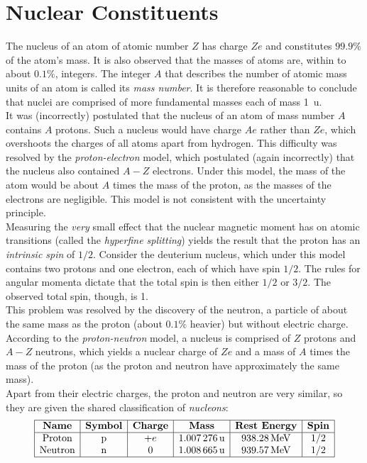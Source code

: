 \documentclass{subfiles}
\begin{document}
	\section{Nuclear Constituents}
		The nucleus of an atom of atomic number \(Z\) has charge \(Ze\) and constitutes \(99.9\%\) of the atom's mass. It is also observed that the masses of atoms are, within to about \(0.1\%\), integers. The integer \(A\) that describes the number of atomic mass units of an atom is called its \textit{mass number}. It is therefore reasonable to conclude that nuclei are comprised of more fundamental masses each of mass \SI{1}{u}. \\
			It was (incorrectly) postulated that the nucleus of an atom of mass number \(A\) contains \(A\) protons. Such a nucleus would have charge \(Ae\) rather than \(Ze\), which overshoots the charges of all atoms apart from hydrogen. This difficulty was resolved by the \textit{proton-electron} model, which postulated (again incorrectly) that the nucleus also contained \(A - Z\) electrons. Under this model, the mass of the atom would be about \(A\) times the mass of the proton, as the masses of the electrons are negligible. This model is not consistent with the uncertainty principle. \\
			Measuring the \textit{very} small effect that the nuclear magnetic moment has on atomic transitions (called the \textit{hyperfine splitting}) yields the result that the proton has an \textit{intrinsic spin} of \(1/2\). Consider the deuterium nucleus, which under this model contains two protons and one electron, each of which have spin \(1/2\). The rules for angular momenta dictate that the total spin is then either \(1/2\) or \(3/2\). The observed total spin, though, is 1. \\
			This problem was resolved by the discovery of the neutron, a particle of about the same mass as the proton (about \(0.1\%\) heavier) but without electric charge. According to the \textit{proton-neutron} model, a nucleus is comprised of \(Z\) protons and \(A - Z\) neutrons, which yields a nuclear charge of \(Ze\) and a mass of \(A\) times the mass of the proton (as the proton and neutron have approximately the same mass). \\
			Apart from their electric charges, the proton and neutron are very similar, so they are given the shared classification of \textit{nucleons}:
			\[\begin{array}{*{6}{|c}|}\hline
				\textbf{Name} & \textbf{Symbol} & \textbf{Charge} & \textbf{Mass} & \textbf{Rest Energy} & \textbf{Spin} \\\hline
				\text{Proton} & \text{p} & +e & \SI{1.007276}{u} & \SI{938.28}{MeV} & 1/2 \\
				\text{Neutron} & \text{n} & 0 & \SI{1.008665}{u} & \SI{939.57}{MeV} & 1/2 \\\hline
			\end{array}\]
\end{document}
